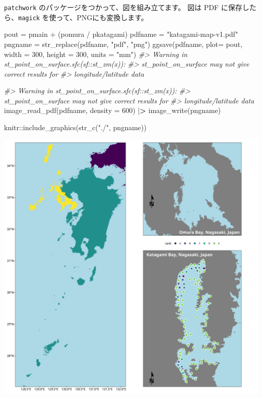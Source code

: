 \documentclass[
]{book}
\newenvironment{Shaded}{\begin{snugshade}}{\end{snugshade}}
\newcommand{\AttributeTok}[1]{\textcolor[rgb]{0.77,0.63,0.00}{#1}}
\newcommand{\CommentTok}[1]{\textcolor[rgb]{0.56,0.35,0.01}{\textit{#1}}}
\newcommand{\DecValTok}[1]{\textcolor[rgb]{0.00,0.00,0.81}{#1}}
\newcommand{\ErrorTok}[1]{\textcolor[rgb]{0.64,0.00,0.00}{\textbf{#1}}}
\newcommand{\FunctionTok}[1]{\textcolor[rgb]{0.00,0.00,0.00}{#1}}
\newcommand{\NormalTok}[1]{#1}
\newcommand{\OtherTok}[1]{\textcolor[rgb]{0.56,0.35,0.01}{#1}}
\newcommand{\SpecialCharTok}[1]{\textcolor[rgb]{0.00,0.00,0.00}{#1}}
\newcommand{\StringTok}[1]{\textcolor[rgb]{0.31,0.60,0.02}{#1}}
\theoremstyle{definition}
\theoremstyle{definition}
\theoremstyle{definition}
\theoremstyle{definition}
\theoremstyle{remark}
\begin{document}
\texttt{patchwork} のパッケージをつかって、図を組み立てます。
図は PDF に保存したら、\texttt{magick} を使って、PNGにも変換します。

\begin{Shaded}
\begin{Highlighting}[]
\NormalTok{pout }\OtherTok{=}\NormalTok{ pmain }\SpecialCharTok{+}\NormalTok{ (pomura }\SpecialCharTok{/}\NormalTok{ pkatagami)}
\NormalTok{pdfname }\OtherTok{=} \StringTok{"katagami{-}map{-}v1.pdf"}
\NormalTok{pngname }\OtherTok{=} \FunctionTok{str\_replace}\NormalTok{(pdfname, }\StringTok{"pdf"}\NormalTok{, }\StringTok{"png"}\NormalTok{)}
\FunctionTok{ggsave}\NormalTok{(pdfname, }\AttributeTok{plot=}\NormalTok{ pout, }\AttributeTok{width =} \DecValTok{300}\NormalTok{, }\AttributeTok{height =} \DecValTok{300}\NormalTok{, }\AttributeTok{units =} \StringTok{"mm"}\NormalTok{)}
\CommentTok{\#\textgreater{} Warning in st\_point\_on\_surface.sfc(sf::st\_zm(x)):}
\CommentTok{\#\textgreater{} st\_point\_on\_surface may not give correct results for}
\CommentTok{\#\textgreater{} longitude/latitude data}

\CommentTok{\#\textgreater{} Warning in st\_point\_on\_surface.sfc(sf::st\_zm(x)):}
\CommentTok{\#\textgreater{} st\_point\_on\_surface may not give correct results for}
\CommentTok{\#\textgreater{} longitude/latitude data}
\FunctionTok{image\_read\_pdf}\NormalTok{(pdfname, }\AttributeTok{density =} \DecValTok{600}\NormalTok{) }\SpecialCharTok{|}\ErrorTok{\textgreater{}} \FunctionTok{image\_write}\NormalTok{(pngname)}
\end{Highlighting}
\end{Shaded}

\begin{Shaded}
\begin{Highlighting}[]
\NormalTok{knitr}\SpecialCharTok{::}\FunctionTok{include\_graphics}\NormalTok{(}\FunctionTok{str\_c}\NormalTok{(}\StringTok{"./"}\NormalTok{, pngname))}
\end{Highlighting}
\end{Shaded}

\includegraphics[width=0.5\linewidth]{./katagami-map-v1}
\end{document}
